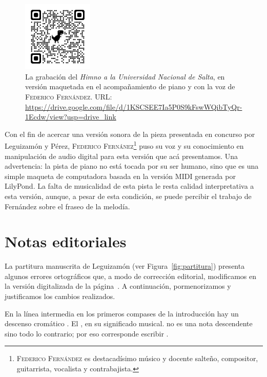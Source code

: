 \begin{figure}[H]
\centering
\includegraphics[width=0.3\textwidth]{img/qrcode-himno-fernandez}
\caption[La grabación del \emph{Himno}.]{La grabación del \emph{Himno a la Universidad Nacional de Salta}, en versión maquetada en el acompañamiento de piano y con la voz de \textsc{Federico Fernández}. URL: \url{https://drive.google.com/file/d/1KSCSEE7Ia5P0S9kFswWQibTyQr-1Ecdw/view?usp=drive_link}}
\label{fig:grabacion}
\end{figure}

Con el fin de acercar una versión sonora de la pieza presentada en concurso por Leguizamón y Pérez, \textsc{Federico Fernánez}\footnote{\textsc{Federico Fernández} es destacadísimo músico y docente salteño, compositor, guitarrista, vocalista y contrabajista.} puso su voz y su conocimiento en manipulación de audio digital para esta versión que acá presentamos. Una advertencia: la pista de piano no está tocada por su ser humano, sino que es una simple maqueta de computadora basada en la versión MIDI generada por LilyPond. La falta de musicalidad de esta pista le resta calidad interpretativa a esta versión, aunque, a pesar de esta condición, se puede percibir el trabajo de Fernández sobre el fraseo de la melodía.


\section{Notas editoriales}
\label{sec:notas-editoriales}

La partitura manuscrita de Leguizamón (ver Figura~\ref{fig:partitura}) presenta algunos errores ortográficos que, a modo de corrección editorial, modificamos en la versión digitalizada de la página~\pageref{partitura-digitalizada}. A continuación, pormenorizamos y justificamos los cambios realizados.

En la línea intermedia en los primeros compases de la introducción hay un descenso cromático \hbox{.} El \hbox{,} en su significado musical. no es una nota descendente sino todo lo contrario; por eso corresponde escribir \hbox{.}

